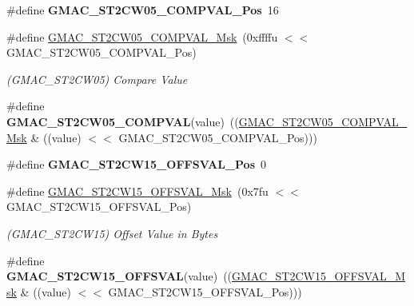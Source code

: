 \begin{DoxyCompactItemize}
\item 
\mbox{\label{group__SAMV71__GMAC_ga0b7e752dd32614a83eccc9699bd41633}} 
\#define {\bfseries G\+M\+A\+C\+\_\+\+S\+T2\+C\+W05\+\_\+\+C\+O\+M\+P\+V\+A\+L\+\_\+\+Pos}~16
\item 
\mbox{\label{group__SAMV71__GMAC_ga4fed340f7f3215dafbc1a6188948e71c}} 
\#define \mbox{\hyperlink{group__SAMV71__GMAC_ga4fed340f7f3215dafbc1a6188948e71c}{G\+M\+A\+C\+\_\+\+S\+T2\+C\+W05\+\_\+\+C\+O\+M\+P\+V\+A\+L\+\_\+\+Msk}}~(0xffffu $<$$<$ G\+M\+A\+C\+\_\+\+S\+T2\+C\+W05\+\_\+\+C\+O\+M\+P\+V\+A\+L\+\_\+\+Pos)
\begin{DoxyCompactList}\small\item\em (G\+M\+A\+C\+\_\+\+S\+T2\+C\+W05) Compare Value \end{DoxyCompactList}\item 
\mbox{\label{group__SAMV71__GMAC_gaab96c596f4f85294c54bfc11399b0e17}} 
\#define {\bfseries G\+M\+A\+C\+\_\+\+S\+T2\+C\+W05\+\_\+\+C\+O\+M\+P\+V\+AL}(value)~((\mbox{\hyperlink{group__SAMV71__GMAC_ga4fed340f7f3215dafbc1a6188948e71c}{G\+M\+A\+C\+\_\+\+S\+T2\+C\+W05\+\_\+\+C\+O\+M\+P\+V\+A\+L\+\_\+\+Msk}} \& ((value) $<$$<$ G\+M\+A\+C\+\_\+\+S\+T2\+C\+W05\+\_\+\+C\+O\+M\+P\+V\+A\+L\+\_\+\+Pos)))
\item 
\mbox{\label{group__SAMV71__GMAC_ga30bc89015657482d5c6054cb8b2a2e8f}} 
\#define {\bfseries G\+M\+A\+C\+\_\+\+S\+T2\+C\+W15\+\_\+\+O\+F\+F\+S\+V\+A\+L\+\_\+\+Pos}~0
\item 
\mbox{\label{group__SAMV71__GMAC_ga5568bdd3e5c39c5a07148b3a4f238568}} 
\#define \mbox{\hyperlink{group__SAMV71__GMAC_ga5568bdd3e5c39c5a07148b3a4f238568}{G\+M\+A\+C\+\_\+\+S\+T2\+C\+W15\+\_\+\+O\+F\+F\+S\+V\+A\+L\+\_\+\+Msk}}~(0x7fu $<$$<$ G\+M\+A\+C\+\_\+\+S\+T2\+C\+W15\+\_\+\+O\+F\+F\+S\+V\+A\+L\+\_\+\+Pos)
\begin{DoxyCompactList}\small\item\em (G\+M\+A\+C\+\_\+\+S\+T2\+C\+W15) Offset Value in Bytes \end{DoxyCompactList}\item 
\mbox{\label{group__SAMV71__GMAC_gafe6080dd5deafe1e086e799ff0567f43}} 
\#define {\bfseries G\+M\+A\+C\+\_\+\+S\+T2\+C\+W15\+\_\+\+O\+F\+F\+S\+V\+AL}(value)~((\mbox{\hyperlink{group__SAMV71__GMAC_ga5568bdd3e5c39c5a07148b3a4f238568}{G\+M\+A\+C\+\_\+\+S\+T2\+C\+W15\+\_\+\+O\+F\+F\+S\+V\+A\+L\+\_\+\+Msk}} \& ((value) $<$$<$ G\+M\+A\+C\+\_\+\+S\+T2\+C\+W15\+\_\+\+O\+F\+F\+S\+V\+A\+L\+\_\+\+Pos)))

\end{DoxyCompactItemize}
